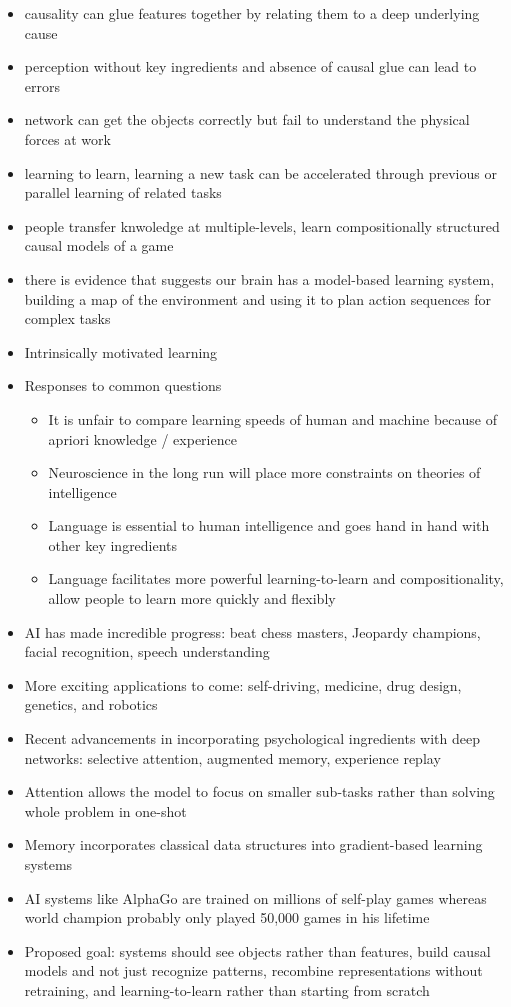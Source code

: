 \begin{itemize}
  \item causality can glue features together by relating them to a deep underlying cause
  \item perception without key ingredients and absence of causal glue can lead to errors
  \item network can get the objects correctly but fail to understand the physical forces at work
  \item learning to learn, learning a new task can be accelerated through previous or parallel learning of related tasks
  \item people transfer knwoledge at multiple-levels, learn compositionally structured causal models of a game
  \item there is evidence that suggests our brain has a model-based learning system, building a map of the environment and using it to plan action sequences for complex tasks
  \item Intrinsically motivated learning
  \item Responses to common questions
  \begin{itemize}
    \item It is unfair to compare learning speeds of human and machine because of apriori knowledge / experience
    \item Neuroscience in the long run will place more constraints on theories of intelligence
    \item Language is essential to human intelligence and goes hand in hand with other key ingredients
    \item Language facilitates more powerful learning-to-learn and compositionality, allow people to learn more quickly and flexibly
  \end{itemize}
  \item AI has made incredible progress: beat chess masters, Jeopardy champions, facial recognition, speech understanding
  \item More exciting applications to come: self-driving, medicine, drug design, genetics, and robotics
  \item Recent advancements in incorporating psychological ingredients with deep networks: selective attention, augmented memory, experience replay
  \item Attention allows the model to focus on smaller sub-tasks rather than solving whole problem in one-shot
  \item Memory incorporates classical data structures into gradient-based learning systems
  \item AI systems like AlphaGo are trained on millions of self-play games whereas world champion probably only played 50,000 games in his lifetime
  \item Proposed goal: systems should see objects rather than features, build causal models and not just recognize patterns, recombine representations without retraining, and learning-to-learn rather than starting from scratch
\end{itemize}